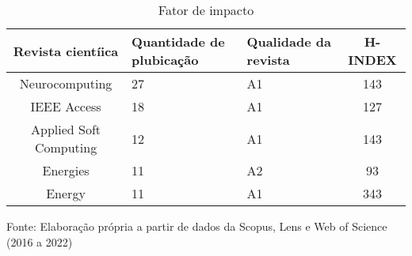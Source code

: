 \begin{table}[H]
	\centering
	\caption{Fator de impacto}\label{tb2}
	\begin{tabular}{@{}cp{3cm}p{3cm}c@{}}
		\toprule
		Revista cientíica      & Quantidade de plubicação & Qualidade da revista & H-INDEX \\\midrule
		Neurocomputing         & 27                         & A1                     & 143     \\
		IEEE Access            & 18                         & A1                     & 127     \\
		Applied Soft Computing & 12                         & A1                     & 143     \\
		Energies               & 11                         & A2                     & 93      \\
		Energy                 & 11                         & A1                     & 343     \\ \bottomrule
	\end{tabular}
	
	
	\vspace{0.2cm}
	Fonte: Elaboração própria a partir de dados da Scopus, Lens e Web of Science (2016 a 2022)
\end{table}